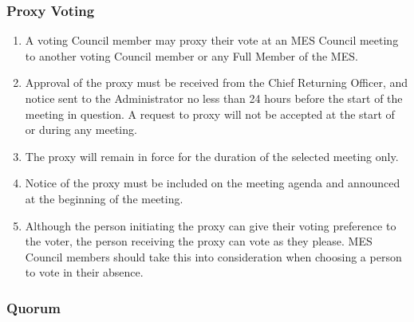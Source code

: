 \hypertarget{proxy-voting}{%
 \subsubsection{Proxy Voting}
 \label{proxy-voting}}
\begin{enumerate}
 \item
  A voting Council member may proxy their vote at an MES Council meeting
  to another voting Council member or any Full Member of the MES.
 \item
  Approval of the proxy must be received from the Chief Returning
  Officer, and notice sent to the Administrator no less than 24 hours
  before the start of the meeting in question. A request to proxy will
  not be accepted at the start of or during any meeting.
 \item
  The proxy will remain in force for the duration of the selected
  meeting only.
 \item
  Notice of the proxy must be included on the meeting agenda and
  announced at the beginning of the meeting.
 \item
  Although the person initiating the proxy can give their voting
  preference to the voter, the person receiving the proxy can vote as
  they please. MES Council members should take this into consideration
  when choosing a person to vote in their absence.
\end{enumerate}

\hypertarget{quorum}{%
 \subsubsection{Quorum}
 \label{quorum}}

